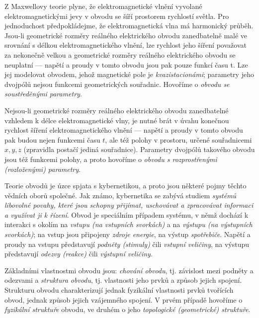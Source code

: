 {      Z Maxwellovy teorie plyne, že elektromagnetické vlnění vyvolané elektromagnetickými jevy v 
      obvodu se šíří prostorem rychlostí světla. Pro jednoduchost předpokládejme, že 
      elektromagnetická vlna má harmonický průběh. Jsou-li geometrické rozměry reálného 
      elektrického obvodu zanedbatelně malé ve srovnání s délkou elektromagnetického vlnění, lze 
      rychlost jeho šíření považovat za nekonečně velkou a geometrické rozměry reálného 
      elektrického obvodu se neuplatní — napětí a proudy v tomto obvodu jsou pak pouze funkcí času 
      t. Lze jej modelovat obvodem, jehož magnetické pole je \emph{kvazistacionámi}; parametry jeho 
      dvojpólů nejsou funkcemi geometrických souřadnic. Hovoříme o \emph{obvodu se soustředěnými 
      parametry}.
      
      Nejsou-li geometrické rozměry reálného elektrického obvodu zanedbatelné vzhledem k délce 
      elektromagnetické vlny, je nutné brát v úvahu konečnou rychlost šíření elektromagnetického 
      vlnění — napětí a proudy v tomto obvodu pak budou nejen funkcemi času \(t\), ale též polohy v 
      prostoru, určené souřadnicemi \(x, y, z\) (zpravidla postačí jediná souřadnice). Parametry 
      dvojpólů takového obvodu jsou též funkcemi polohy, a proto hovoříme o \emph{obvodu s 
      rozprostřenými (rozloženými) parametry}.
            
      Teorie obvodů je úzce spjata s kybernetikou, a proto jsou některé pojmy těchto vědních oborů 
      společné. Jak známo, kybernetika se zabývá studiem \emph{systémů libovolné povahy, které jsou 
      schopny přijímat, uschovávat a zpracovávat informaci a využívat ji k řízení}. Obvod je 
      speciálním případem systému, v němž dochází k interakci s okolím na \emph{vstupu (na 
      vstupních svorkách)} a na \emph{výstupu (na výstupních svorkách)}; na vstup jsou připojeny 
      \emph{zdroje energie}, na výstup \emph{spotřebiče}. Napětí a proudy na vstupu představují 
      \emph{podněty (stimuly)} čili \emph{vstupní veličiny}, na výstupu představují \emph{odezvy 
      (reakce)} čili \emph{výstupní veličiny}.
      
      Základními vlastnostmi obvodu jsou: \emph{chování obvodu}, tj. závislost mezi podněty a 
      odezvami a \emph{struktura obvodu}, tj. vlastnosti jeho prvků a způsob jejich spojení. 
      Strukturu obvodu charakterizují jednak fyzikální vlastnosti prvků tvořících obvod, jednak 
      způsob jejich vzájemného spojení. V prvém případě hovoříme o \emph{fyzikální struktuře} 
      obvodu, ve druhém o jeho \emph{topologické (geometrické) struktuře}\cite[s.~21]{Meyer1978}.
      
}
